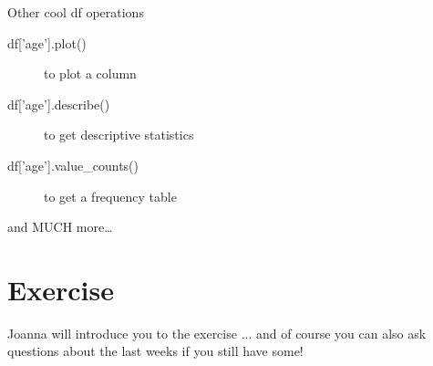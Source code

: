 \documentclass{beamer}
\begin{document}
\begin{frame}[fragile]{Other cool df operations}
\begin{description}
	\item[df{['age']}.plot()] to plot a column
	\item[df{['age']}.describe()] to get descriptive statistics 
	\item[df{['age']}.value\_counts()] to get a frequency table
\end{description}
and MUCH more\ldots
	
\end{frame}


\section{Exercise}
\begin{frame}[plain]
{\huge{Joanna will introduce you to the exercise} }
\vskip 1cm
... and of course you can also ask questions about the last weeks if you still have some!
\end{frame}
\end{document}
